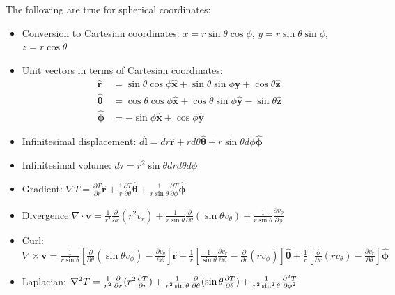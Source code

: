 \documentclass{article}
\begin{document}
The following are true for spherical coordinates:
\begin{itemize}
    \item Conversion to Cartesian coordinates: \(x=r\sin \theta \cos \phi\), \(y=r\sin \theta \sin \phi\), \(z=r\cos \theta\)
    \item Unit vectors in terms of Cartesian coordinates:
        \begin{align*}
            \mathbf{\hat{r}} &=\sin\theta \cos \phi \mathbf{\hat{x}} +\sin \theta \sin \phi \mathbf{\hat{y}} +\cos \theta \mathbf{\hat{z}} \\
            \mathbf{\hat{\theta}} &=\cos \theta \cos \phi \mathbf{\hat{x}} + \cos \theta  \sin \phi \mathbf{\hat{y}} -\sin \theta \mathbf{\hat{z}} \\
            \mathbf{\hat{\phi}} &=-\sin \phi \mathbf{\hat{x}} +\cos \phi \mathbf{\hat{y}} 
        \end{align*}
    \item Infinitesimal displacement: \(d \mathbf{\hat{l}} =dr \mathbf{\hat{r}} +r d \theta  \mathbf{\hat{\theta}} +r \sin \theta  d \phi \mathbf{\hat{\phi}}  \) 
    \item Infinitesimal volume: \(d \tau =r^2 \sin \theta  dr d \theta  d \phi \) 
    \item Gradient: \(\nabla T=\frac{\partial T}{\partial r}\mathbf{\hat{r}} +\frac{1}{r}\frac{\partial T}{\partial \theta }\mathbf{\hat{\theta}} +\frac{1}{r \sin \theta }\frac{\partial T}{\partial \phi } \mathbf{\hat{\phi}}  \) 
    \item Divergence:\(\nabla \cdot \mathbf{v} = \frac{1}{r^2}\frac{\partial}{\partial r}(r^2v_r)+\frac{1}{r \sin \theta }\frac{\partial}{\partial \theta }(\sin \theta  v_{\theta })+\frac{1}{r \sin \theta }\frac{\partial v_{\phi }}{\partial \phi }\)
    \item Curl: \(\nabla \times \mathbf{v} =\frac{1}{r\sin \theta }[\frac{\partial}{\partial \theta }(\sin \theta v_{\phi })-\frac{\partial v_{\theta }}{\partial \phi }]\mathbf{\hat{r}} +\frac{1}{r}[\frac{1}{\sin \theta }\frac{\partial v_r}{\partial \phi }-\frac{\partial}{\partial r }(rv_{\phi })]\mathbf{\hat{\theta}} +\frac{1}{r}[\frac{\partial}{\partial r}(rv_{\theta })-\frac{\partial v_r}{\partial \theta }]\mathbf{\hat{\phi}}   \) 
    \item Laplacian: \(\laplacian{T}=\frac{1}{r^2}\frac{\partial}{\partial r}(r^2\frac{\partial T}{\partial r})+\frac{1}{r^2 \sin \theta }\frac{\partial }{\partial \theta }(\sin \theta  \frac{\partial T}{\partial \theta })+\frac{1}{r^2 \sin^2 \theta }\frac{\partial ^2 T}{\partial \phi ^2}\)  
\end{itemize}
\end{document}

